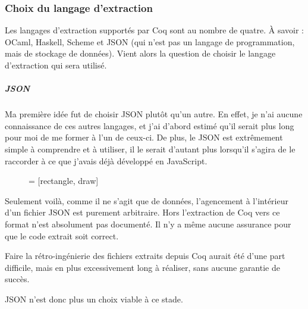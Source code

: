 \documentclass[]{article}
\begin{document}
\subsubsection{Choix du langage d'extraction}
Les langages d'extraction supportés par Coq sont au nombre de quatre. À savoir : OCaml, Haskell, Scheme et JSON (qui n'est pas un langage de programmation, mais de stockage de données). Vient alors la question de choisir le langage d'extraction qui sera utilisé.

\subparagraph*{JSON}
Ma première idée fut de choisir JSON plutôt qu'un autre. En effet, je n'ai aucune connaissance de ces autres langages, et j'ai d'abord estimé qu'il serait plus long pour moi de me former à l'un de ceux-ci. De plus, le JSON est extrêmement simple à comprendre et à utiliser, il le serait d'autant plus lorsqu'il s'agira de le raccorder à ce que j'avais déjà développé en JavaScript.
\begin{figure}[H]
	\begin{center}
		 = [rectangle, draw]
	\end{center}
\end{figure}
Seulement voilà, comme il ne s'agit que de données, l'agencement à l'intérieur d'un fichier JSON est purement arbitraire. Hors l'extraction de Coq vers ce format n'est absolument pas documenté. Il n'y a même aucune assurance pour que le code extrait soit correct.

Faire la rétro-ingénierie des fichiers extraits depuis Coq aurait été d'une part difficile, mais en plus excessivement long à réaliser, sans aucune garantie de succès.

JSON n'est donc plus un choix viable à ce stade.
\end{document}
